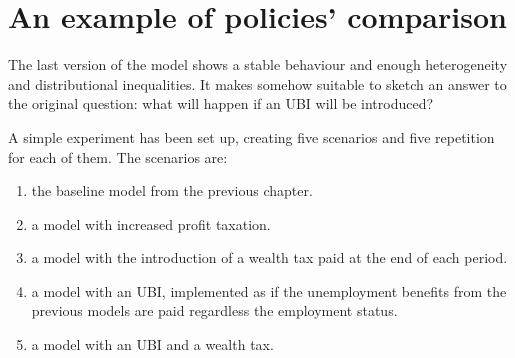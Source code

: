 \chapter{An example of policies' comparison}
\label{ch:policy}
The last version of the model shows a stable behaviour and enough heterogeneity and distributional inequalities. It makes somehow suitable to sketch an answer to the original question: what will happen if an UBI will be introduced?

A simple experiment has been set up, creating five scenarios and five repetition for each of them. The scenarios are:
\begin{enumerate}
    \item the baseline model from the previous chapter.
    \item a model with increased profit taxation.
    \item a model with the introduction of a wealth tax paid at the end of each period.
    \item a model with an UBI, implemented as if the unemployment benefits from the previous models are paid regardless the employment status.
    \item a model with an UBI and a wealth tax.
\end{enumerate}

